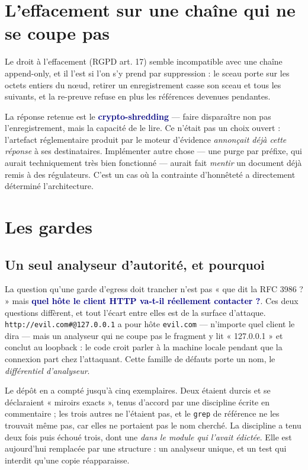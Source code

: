\documentclass[10pt]{article}
\newcommand{\code}[1]{\texttt{\small #1}}
\newcommand{\mm}[1]{\textbf{\textcolor{navy}{#1}}}
\begin{document}
\section{L'effacement sur une chaîne qui ne se coupe pas}

Le droit à l'effacement (RGPD art. 17) semble incompatible avec une chaîne append-only, et il l'est si l'on s'y prend par suppression : le sceau porte sur les octets entiers du nœud, retirer un enregistrement casse son sceau et tous les suivants, et la re-preuve refuse en plus les références devenues pendantes.

La réponse retenue est le \mm{crypto-shredding} — faire disparaître non pas l'enregistrement, mais la capacité de le lire. Ce n'était pas un choix ouvert : l'artefact réglementaire produit par le moteur d'évidence \emph{annonçait déjà cette réponse} à ses destinataires. Implémenter autre chose — une purge par préfixe, qui aurait techniquement très bien fonctionné — aurait fait \emph{mentir} un document déjà remis à des régulateurs. C'est un cas où la contrainte d'honnêteté a directement déterminé l'architecture.

\section{Les gardes}\label{sec:gardes}

\subsection{Un seul analyseur d'autorité, et pourquoi}

La question qu'une garde d'egress doit trancher n'est pas « que dit la RFC 3986 ? » mais \mm{quel hôte le client HTTP va-t-il réellement contacter ?}. Ces deux questions diffèrent, et tout l'écart entre elles est de la surface d'attaque. \code{http://evil.com\#@127.0.0.1} a pour hôte \code{evil.com} — n'importe quel client le dira — mais un analyseur qui ne coupe pas le fragment y lit « 127.0.0.1 » et conclut au loopback : le code croit parler à la machine locale pendant que la connexion part chez l'attaquant. Cette famille de défauts porte un nom, le \emph{différentiel d'analyseur}.

Le dépôt en a compté jusqu'à cinq exemplaires. Deux étaient durcis et se déclaraient « miroirs exacts », tenus d'accord par une discipline écrite en commentaire ; les trois autres ne l'étaient pas, et le \code{grep} de référence ne les trouvait même pas, car elles ne portaient pas le nom cherché. La discipline a tenu deux fois puis échoué trois, dont une \emph{dans le module qui l'avait édictée}. Elle est aujourd'hui remplacée par une structure : un analyseur unique, et un test qui interdit qu'une copie réapparaisse.
\end{document}
